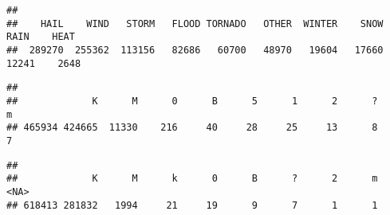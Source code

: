\documentclass[
]{article}
\newenvironment{Shaded}{\begin{snugshade}}{\end{snugshade}}
\newcommand{\DataTypeTok}[1]{\textcolor[rgb]{0.13,0.29,0.53}{#1}}
\newcommand{\DecValTok}[1]{\textcolor[rgb]{0.00,0.00,0.81}{#1}}
\newcommand{\KeywordTok}[1]{\textcolor[rgb]{0.13,0.29,0.53}{\textbf{#1}}}
\newcommand{\NormalTok}[1]{#1}
\newcommand{\OperatorTok}[1]{\textcolor[rgb]{0.81,0.36,0.00}{\textbf{#1}}}
\newcommand{\OtherTok}[1]{\textcolor[rgb]{0.56,0.35,0.01}{#1}}
\begin{document}
\begin{verbatim}
## 
##    HAIL    WIND   STORM   FLOOD TORNADO   OTHER  WINTER    SNOW    RAIN    HEAT 
##  289270  255362  113156   82686   60700   48970   19604   17660   12241    2648
\end{verbatim}

\begin{Shaded}
\end{Shaded}

\begin{verbatim}
## 
##             K      M      0      B      5      1      2      ?      m 
## 465934 424665  11330    216     40     28     25     13      8      7
\end{verbatim}

\begin{Shaded}
\end{Shaded}

\begin{verbatim}
## 
##             K      M      k      0      B      ?      2      m   <NA> 
## 618413 281832   1994     21     19      9      7      1      1
\end{verbatim}
\end{document}
